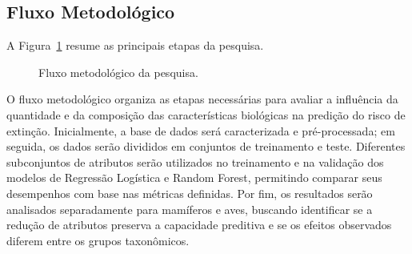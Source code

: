 \documentclass[conference]{IEEEtran}
\begin{document}
\subsection{Fluxo Metodológico}

A Figura~\ref{fig:fluxo_metodologico} resume as principais etapas da pesquisa.

\begin{figure}[htbp]
\centering
{}
\caption{Fluxo metodológico da pesquisa.}
\label{fig:fluxo_metodologico}
\end{figure}

O fluxo metodológico organiza as etapas necessárias para avaliar a influência da quantidade e da composição das características biológicas na predição do risco de extinção. Inicialmente, a base de dados será caracterizada e pré-processada; em seguida, os dados serão divididos em conjuntos de treinamento e teste. Diferentes subconjuntos de atributos serão utilizados no treinamento e na validação dos modelos de Regressão Logística e Random Forest, permitindo comparar seus desempenhos com base nas métricas definidas. Por fim, os resultados serão analisados separadamente para mamíferos e aves, buscando identificar se a redução de atributos preserva a capacidade preditiva e se os efeitos observados diferem entre os grupos taxonômicos.

\end{document}
